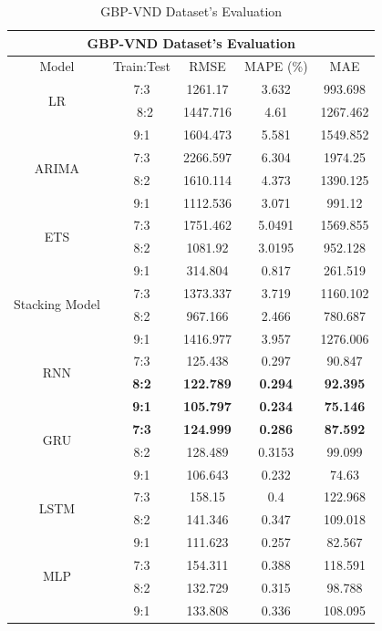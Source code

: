 \documentclass{ieeeojies}
\begin{document}
\begin{table}[H]
    \centering
    \begin{tabular}{|c|c|c|c|c|}
         \hline
         \multicolumn{5}{|c|}{\textbf{GBP-VND Dataset's Evaluation}}\\
         \hline
         \centering Model & Train:Test & RMSE & MAPE (\%) & MAE\\
         \hline
         \multirow{2}{*}{LR} &7:3&1261.17 &3.632 &993.698\\ &\ 8:2 & 1447.716& 4.61 & 1267.462 \\&9:1 &1604.473 & 5.581 &1549.852 \\
         \hline
         \multirow{2}{*}{ARIMA} &7:3 & 2266.597 &6.304 &1974.25 \\ & 8:2 & 1610.114 & 4.373 & 1390.125 \\&9:1&1112.536 &3.071 & 991.12\\
         \hline
         \multirow{2}{*}{ETS} & 7:3 & 1751.462&5.0491&1569.855 \\ & 8:2 & 1081.92&3.0195&952.128 \\& 9:1& 314.804 & 0.817 & 261.519\\
         \hline
         \multirow{2}{*}{Stacking Model}&7:3&1373.337&3.719&1160.102\\&8:2&967.166&2.466&780.687\\&9:1&1416.977&3.957&1276.006 \\
         \hline
         \multirow{2}{*}{RNN} & 7:3 & 125.438 & 0.297 & 90.847 \\ & \textbf{8:2} & \textbf{122.789} & \textbf{0.294} & \textbf{92.395} \\ & \textbf{9:1} & \textbf{105.797} & \textbf{0.234} & \textbf{75.146} \\
         \hline
         \multirow{2}{*}{GRU} & \textbf{7:3} & \textbf{124.999} & \textbf{0.286} & \textbf{87.592} \\ & 8:2 & 128.489 & 0.3153 & 99.099 \\ & 9:1 & 106.643 & 0.232 & 74.63 \\
         \hline
         \multirow{2}{*}{LSTM} &7:3 &158.15& 0.4& 122.968 \\ & 8:2 &141.346& 0.347& 109.018\\&9:1&111.623& 0.257& 82.567\\
         \hline
         \multirow{2}{*}{MLP} & 7:3 & 154.311& 0.388 &118.591 \\ &8:2 & 132.729& 0.315& 98.788\\ & 9:1 & 133.808& 0.336 &108.095\\
         \hline
    \end{tabular}
    \caption{GBP-VND Dataset's Evaluation}
    \label{mbbresult}
\end{table}
\end{document}
